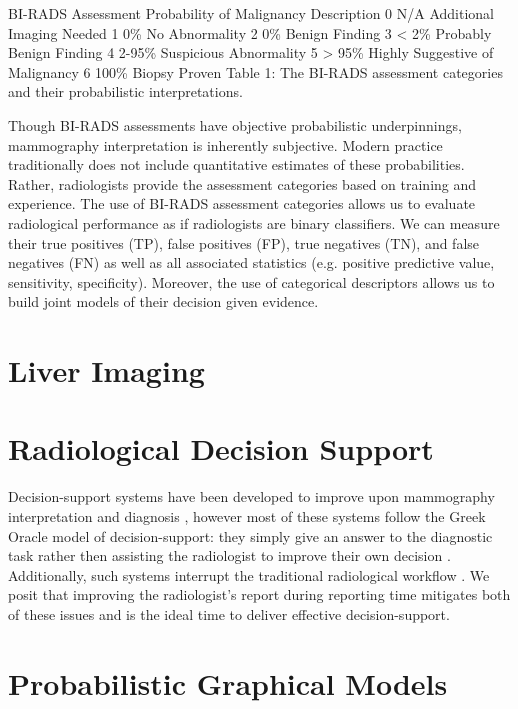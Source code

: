 BI-RADS Assessment	Probability of Malignancy	Description
0	N/A	Additional Imaging Needed
1	0\%	No Abnormality
2	0\%	Benign Finding
3	< 2\%	Probably Benign Finding
4	2-95\%	Suspicious Abnormality
5	> 95\%	Highly Suggestive of Malignancy
6	100\%	Biopsy Proven
Table 1: The BI-RADS assessment categories and their probabilistic interpretations.

Though BI-RADS assessments have objective probabilistic underpinnings, mammography interpretation is inherently subjective. Modern practice traditionally does not include quantitative estimates of these probabilities. Rather, radiologists provide the assessment categories based on training and experience. The use of BI-RADS assessment categories allows us to evaluate radiological performance as if radiologists are binary classifiers. We can measure their true positives (TP), false positives (FP), true negatives (TN), and false negatives (FN) as well as all associated statistics (e.g. positive predictive value, sensitivity, specificity). Moreover, the use of categorical descriptors allows us to build joint models of their decision given evidence.



\section{Liver Imaging}

\section{Radiological Decision Support}
Decision-support systems have been developed to improve upon mammography interpretation and diagnosis \cite{Garg:2005cb, Burnside:2000wl, ElizabethS:2005gc, Rubin:2005jg}, however most of these systems follow the Greek Oracle model of decision-support: they simply give an answer to the diagnostic task rather then assisting the radiologist to improve their own decision \cite{Miller:1990wg, Friedman:2009dx}. Additionally, such systems interrupt the traditional radiological workflow \cite{Morgan:2011ct}. We posit that improving the radiologist’s report during reporting time mitigates both of these issues and is the ideal time to deliver effective decision-support.

\section{Probabilistic Graphical Models}